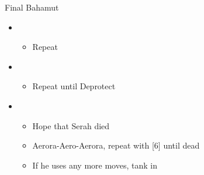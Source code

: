 \begin{battle}{Final Bahamut}
\begin{flushleft}
\begin{itemize}
\begin{itemize}
			      \end{itemize}
			\item \sixth
			      \begin{itemize}
				      \item Repeat
			      \end{itemize}
			\item \third
			      \begin{itemize}
				      \item Repeat until Deprotect
			      \end{itemize}
			\item \fifth
			      \begin{itemize}
				      \item Hope that Serah died
				      \item Aerora-Aero-Aerora, repeat with [6] until dead
				      \item If he uses any more moves, tank in \fourth
			      \end{itemize}
		\end{itemize}
	\end{flushleft}
\end{battle}

